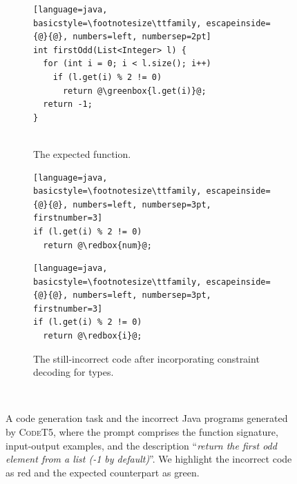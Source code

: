 \documentclass[manuscript,screen]{acmart}
\newcommand{\toolname}[1]{\textsc{#1}}
\newcommand{\redbox}[1]{{\setlength{\fboxsep}{2pt}\colorbox{red!20}{#1}}}
\newcommand{\greenbox}[1]{{\setlength{\fboxsep}{2pt}\colorbox{green!20}{#1}}}
\begin{document}
\begin{figure}
\hfill
    \begin{subfigure}{0.45\textwidth}
        \begin{lstlisting}[language=java, basicstyle=\footnotesize\ttfamily, escapeinside={@}{@}, numbers=left, numbersep=2pt]
int firstOdd(List<Integer> l) {
  for (int i = 0; i < l.size(); i++)
    if (l.get(i) % 2 != 0)
      return @\greenbox{l.get(i)}@;
  return -1;
}
        
\end{lstlisting}
\vspace{-0.5em}
\caption{The expected function.}
\vspace{1em}
        \label{fig:codet5-correct}
    \end{subfigure}
    \hfill
    \begin{subfigure}{0.45\textwidth}
\centering 
\begin{minipage}{0.6\textwidth}
\begin{lstlisting}[language=java, basicstyle=\footnotesize\ttfamily, escapeinside={@}{@}, numbers=left, numbersep=3pt, firstnumber=3]
if (l.get(i) % 2 != 0)
  return @\redbox{num}@;
\end{lstlisting}
\end{minipage}
\vspace{-0.5em}
\caption{The ill-typed code generated by \toolname{CodeT5}}
\label{fig:codet5-incorrect}
\vspace{1em}
\begin{minipage}{0.6\textwidth}
\begin{lstlisting}[language=java, basicstyle=\footnotesize\ttfamily, escapeinside={@}{@}, numbers=left, numbersep=3pt, firstnumber=3]
if (l.get(i) % 2 != 0)
  return @\redbox{i}@;
\end{lstlisting}
\end{minipage}
\vspace{-0.5em}
\caption{The still-incorrect code after incorporating constraint decoding for types.}
        \label{fig:codet5-constraint-incorrect}
    \end{subfigure}
\hfill\ 
\caption{A code generation task and the incorrect Java programs generated by \toolname{CodeT5}, where the prompt comprises the function signature, input-output examples, and the description ``\emph{return the first odd element from a list (-1 by default)}''. We highlight the incorrect code as \redbox{red} and the expected counterpart as \greenbox{green}.}
    \label{fig:intro-sample}
\end{figure}
\end{document}
